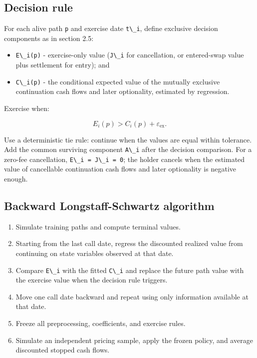 \documentclass[conference]{IEEEtran}
\newcommand{\passthrough}[1]{#1}
\providecommand{\tightlist}{}
\begin{document}
\subsection{Decision rule}\label{81-decision-rule}

For each alive path \passthrough{\lstinline!p!} and exercise date
\passthrough{\lstinline!t\_i!}, define exclusive decision components as
in section 2.5:

\begin{itemize}
\tightlist
\item
  \passthrough{\lstinline!E\_i(p)!} - exercise-only value
  (\passthrough{\lstinline!J\_i!} for cancellation, or entered-swap
  value plus settlement for entry); and
\item
  \passthrough{\lstinline!C\_i(p)!} - the conditional expected value of
  the mutually exclusive continuation cash flows and later optionality,
  estimated by regression.
\end{itemize}

Exercise when:

\begin{equation*}
  E_i(p)>C_i(p)+\varepsilon_{\mathrm{ex}}.
\end{equation*}

Use a deterministic tie rule: continue when the values are equal within
tolerance. Add the common surviving component
\passthrough{\lstinline!A\_i!} after the decision comparison. For a
zero-fee cancellation, \passthrough{\lstinline!E\_i = J\_i = 0!}; the
holder cancels when the estimated value of cancellable continuation cash
flows and later optionality is negative enough.

\subsection{Backward Longstaff-Schwartz
algorithm}\label{82-backward-longstaff-schwartz-algorithm}

\begin{enumerate}
\def\labelenumi{\arabic{enumi}.}
\tightlist
\item
  Simulate training paths and compute terminal values.
\item
  Starting from the last call date, regress the discounted realized
  value from continuing on state variables observed at that date.
\item
  Compare \passthrough{\lstinline!E\_i!} with the fitted
  \passthrough{\lstinline!C\_i!} and replace the future path value with
  the exercise value when the decision rule triggers.
\item
  Move one call date backward and repeat using only information
  available at that date.
\item
  Freeze all preprocessing, coefficients, and exercise rules.
\item
  Simulate an independent pricing sample, apply the frozen policy, and
  average discounted stopped cash flows.
\end{enumerate}
\end{document}
